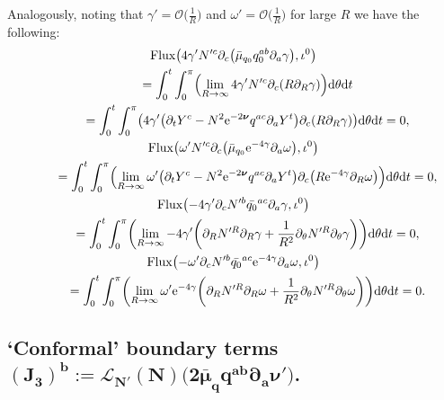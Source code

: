 \documentclass[11pt]{article}
\numberwithin{equation}{section}
\def\ptl{\partial}%
\def\mbo#1{\boldsymbol{#1}}%
\numberwithin{equation}{section}
\begin{document}
Analogously, noting that $\gamma' = \mathcal{O}\bigl(\frac{1}{R}\bigr)$ and $\omega' = \mathcal{O} \bigl(\frac{1}{R}\bigr)$ for large $R$ we have the following:
\begin{gather*}
{\rm Flux} \bigl(4\gamma' N'^c\ptl_c \bigl(\bar{\mu}_{q_0} q^{ab}_0 \ptl_a \gamma\bigr), \iota^0\bigr) \\
\qquad{} = \int^t_0 \int^\pi_0 \Bigl(\lim_{R \to \infty} 4 \gamma' N'^c \ptl_c (R \ptl_R \gamma)\Bigr) {\rm d}\theta {\rm d}t \notag\\
\qquad{} = \int^t_0 \int^\pi_0 \bigl(4 \gamma' \bigl(\ptl_t Y^c - N^2 {\rm e}^{-2 \mbo{\nu}} q^{ac} \ptl_a Y^t\bigr) \ptl_c (R \ptl_R \gamma) \bigr) {\rm d}\theta {\rm d}t
=0,
\\
 {\rm Flux} \bigl(\omega' N'^c \ptl_c \bigl(\bar{\mu}_{q_0} {\rm e}^{-4\gamma} \ptl_a \omega\bigr), \iota^0\bigr) \notag\\
\qquad{} = \int^t_0 \int^\pi_0 \Bigl(\lim_{R \to \infty} \omega' \bigl(\ptl_t Y^c - N^2 {\rm e}^{-2 \mbo{\nu}} q^{ac} \ptl_a Y^t\bigr) \ptl_c \bigl(R {\rm e}^{-4\gamma} \ptl_R \omega\bigr)\Bigr) {\rm d}\theta {\rm d}t
 =0,
\\
 {\rm Flux} \bigl(-4\gamma' \ptl_c N'^b \bar{q_0}^{ac} \ptl_a \gamma, \iota^0\bigr) \notag\\
\qquad{} = \int^t_0 \int^\pi_0 \biggl(\lim_{R \to \infty} -4 \gamma' \biggl(\ptl_R N'^R \ptl_R \gamma + \frac{1}{R^2} \ptl_\theta N'^R \ptl_\theta \gamma \biggr)\biggr) {\rm d}\theta {\rm d}t
 = 0,
\\
 {\rm Flux} \bigl(-\omega' \ptl_c N'^b \bar{q_0}^{ac} {\rm e}^{-4\gamma} \ptl_a \omega, \iota^0\bigr) \notag\\
\qquad{} = \int^t_0 \int^\pi_0 \biggl(\lim_{R \to \infty} \omega' {\rm e}^{-4\gamma} \biggl(\ptl_R N'^R \ptl_R \omega + \frac{1}{R^2} \ptl_\theta N'^R \ptl_\theta \omega \biggr)\biggr) {\rm d}\theta {\rm d}t
 =0.
\end{gather*}

\subsection*{`Conformal' boundary terms $\boldsymbol{
(J_3)^b := \mathcal{L}_{N'} (N) \bigl(2 \bar{\mu}_q q^{ab} \ptl_a \mbo{\nu}'\bigr)}$.}
\end{document}
